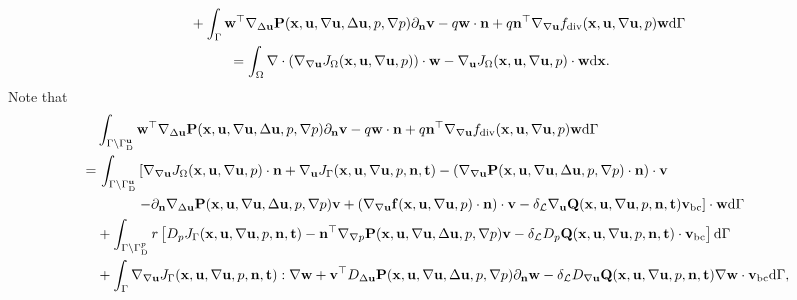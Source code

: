 \documentclass[oneside]{book}
\numberwithin{equation}{section}
\begin{document}
\begin{align*}
    &+ \int_\Gamma {\bf w}^\top\nabla_{\Delta{\bf u}}{\bf P}({\bf x},{\bf u},\nabla{\bf u},\Delta{\bf u},p,\nabla p)\partial_{\bf n}{\bf v} - q{\bf w}\cdot{\bf n} + q{\bf n}^\top\nabla_{\nabla{\bf u}}f_{\rm div}({\bf x},{\bf u},\nabla{\bf u},p){\bf w}{\rm d}\Gamma\\
    &\hspace{1cm} = \int_\Omega \nabla\cdot\left(\nabla_{\nabla{\bf u}}J_\Omega({\bf x},{\bf u},\nabla{\bf u},p)\right)\cdot{\bf w} - \nabla_{\bf u}J_\Omega({\bf x},{\bf u},\nabla{\bf u},p)\cdot{\bf w}{\rm d}{\bf x}.
\end{align*}
Note that
\begin{align*}
    &\int_{\Gamma\backslash\Gamma_{\rm D}^{\bf u}} {\bf w}^\top\nabla_{\Delta{\bf u}}{\bf P}({\bf x},{\bf u},\nabla{\bf u},\Delta{\bf u},p,\nabla p)\partial_{\bf n}{\bf v} - q{\bf w}\cdot{\bf n} + q{\bf n}^\top\nabla_{\nabla{\bf u}}f_{\rm div}({\bf x},{\bf u},\nabla{\bf u},p){\bf w}{\rm d}\Gamma\\
    =&\, \int_{\Gamma\backslash\Gamma_{\rm D}^{\bf u}} \left[\nabla_{\nabla{\bf u}}J_\Omega({\bf x},{\bf u},\nabla{\bf u},p)\cdot{\bf n} + \nabla_{\bf u}J_\Gamma({\bf x},{\bf u},\nabla{\bf u},p,{\bf n},{\bf t}) - \left(\nabla_{\nabla{\bf u}}{\bf P}({\bf x},{\bf u},\nabla{\bf u},\Delta{\bf u},p,\nabla p)\cdot{\bf n}\right)\cdot{\bf v}\right.\\
    &\hspace{1cm} \left.- \partial_{\bf n}\nabla_{\Delta{\bf u}}{\bf P}({\bf x},{\bf u},\nabla{\bf u},\Delta{\bf u},p,\nabla p){\bf v} + \left(\nabla_{\nabla{\bf u}}{\bf f}({\bf x},{\bf u},\nabla{\bf u},p)\cdot{\bf n}\right)\cdot{\bf v} - \delta_{\mathcal{L}}\nabla_{\bf u}{\bf Q}({\bf x},{\bf u},\nabla{\bf u},p,{\bf n},{\bf t}){\bf v}_{\rm bc}\right]\cdot{\bf w}{\rm d}\Gamma\\
    &+ \int_{\Gamma\backslash\Gamma_{\rm D}^p} r\left[D_pJ_\Gamma({\bf x},{\bf u},\nabla{\bf u},p,{\bf n},{\bf t}) - {\bf n}^\top\nabla_{\nabla p}{\bf P}({\bf x},{\bf u},\nabla{\bf u},\Delta{\bf u},p,\nabla p){\bf v} - \delta_{\mathcal{L}}D_p{\bf Q}({\bf x},{\bf u},\nabla{\bf u},p,{\bf n},{\bf t})\cdot{\bf v}_{\rm bc}\right]{\rm d}\Gamma\\
    &+ \int_\Gamma \nabla_{\nabla{\bf u}}J_\Gamma({\bf x},{\bf u},\nabla{\bf u},p,{\bf n},{\bf t}):\nabla{\bf w} + {\bf v}^\top D_{\Delta{\bf u}}{\bf P}({\bf x},{\bf u},\nabla{\bf u},\Delta{\bf u},p,\nabla p)\partial_{\bf n}{\bf w} - \delta_{\mathcal{L}}D_{\nabla{\bf u}}{\bf Q}({\bf x},{\bf u},\nabla{\bf u},p,{\bf n},{\bf t})\nabla{\bf w}\cdot{\bf v}_{\rm bc}{\rm d}\Gamma,
\end{align*}
\end{document}
